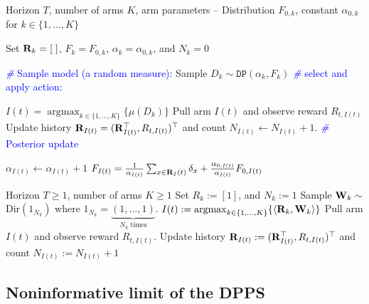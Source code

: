 \documentclass[10pt]{article}
\newcommand{\argmax}{\mathop{\mathrm{argmax}}}
\newcommand{\DP}{\texttt{DP}}
\begin{document}
\begin{algorithm}[h]
\caption{Dirichlet Process Posterior Sampling}\label{alg:DPPS}
\begin{algorithmic}[1]
\Require Horizon $T$, number of arms $K$, arm parameters -- Distribution $F_{0,k}$, constant $\alpha_{0,k}$ for $k \in \{1,. . .,K\}$

\State Set ${\bf R}_{k}=\left[\;\right]$, $F_{k}=F_{0,k}$, $\alpha_{k}=\alpha_{0,k}$, and $N_{k}=0$
\EndFor

\State \textcolor{blue}{\textit{\#} Sample model (a random measure):}
\State Sample $D_{k}\sim \DP(\alpha_{k},{F}_{k})$
\EndFor
\State \textcolor{blue}{\textit{\#} select and apply action:}

\State $I(t) = \argmax_{k\in\{1,...,K\}}\{\mu(D_{k})\}$
\State Pull arm $I(t)$ and observe reward $R_{t,I(t)}$
\State Update history ${\bf R}_{I(t)} = ({\bf R}_{I(t)}^{\top}, R_{t,I(t)})^{\top}$ and count $N_{I(t)} \leftarrow N_{I(t)} + 1$.
\State \textcolor{blue}{\textit{\#} Posterior update}

\State $\alpha_{I(t)} \leftarrow \alpha_{I(t)} + 1$
\State $F_{I(t)} = \frac{1}{\alpha_{I(t)}}\sum_{x\in{\bf R}_I(t)} \delta_{x} + \frac{\alpha_{0,I(t)}}{\alpha_{I(t)}}F_{0,I(t)}$
\EndFor
\end{algorithmic}
\end{algorithm}

\begin{algorithm}[h]
\caption{Algorithm in~\cite{riou2020bandit}}\label{alg:NPTS}
\begin{algorithmic}[1]
\Require Horizon $T \ge 1$, number of arms $K \ge 1$
\State Set $R_{k}:=[1]$, and $N_{k}:=1$
\EndFor 
{}
\State Sample ${\bf W}_k \sim$ Dir$(1_{N_{k}})$ where $1_{N_k} = \underbrace{(1,...,1)}_\text{$N_{k}$ times}$.
\vspace{-1em}
\EndFor
\State $I(t) := \argmax_{k\in\{1,...,K\}}\{\left<{\bf R}_{k},{\bf W}_k\right>\}$
\State Pull arm $I(t)$ and observe reward $R_{t,I(t)}$.
\State Update history ${\bf R}_{I(t)} := ({\bf R}_{I(t)}^{\top} , R_{t,I(t)})^{\top}$ and count $N_{I(t)} := N_{I(t)} + 1$
\EndFor
\end{algorithmic}
\end{algorithm}

\subsection{Noninformative limit of the DPPS}
\label{subsec:NPTS-DPPS}
\end{document}
